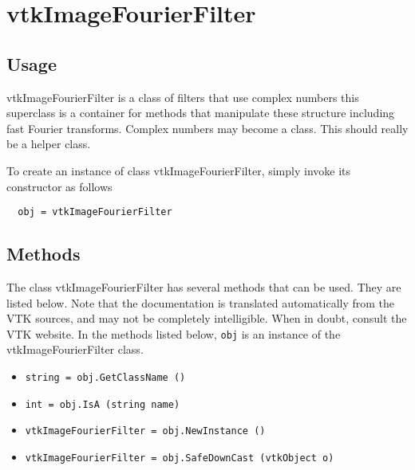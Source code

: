 \section{vtkImageFourierFilter}

\subsection{Usage}

 vtkImageFourierFilter is a class of filters that use complex numbers
 this superclass is a container for methods that manipulate these structure
 including fast Fourier transforms.  Complex numbers may become a class.
 This should really be a helper class.

To create an instance of class vtkImageFourierFilter, simply
invoke its constructor as follows
\begin{verbatim}
  obj = vtkImageFourierFilter
\end{verbatim}
\subsection{Methods}

The class vtkImageFourierFilter has several methods that can be used.
  They are listed below.
Note that the documentation is translated automatically from the VTK sources,
and may not be completely intelligible.  When in doubt, consult the VTK website.
In the methods listed below, \verb|obj| is an instance of the vtkImageFourierFilter class.
\begin{itemize}
\item  \verb|string = obj.GetClassName ()|

\item  \verb|int = obj.IsA (string name)|

\item  \verb|vtkImageFourierFilter = obj.NewInstance ()|

\item  \verb|vtkImageFourierFilter = obj.SafeDownCast (vtkObject o)|

\end{itemize}
